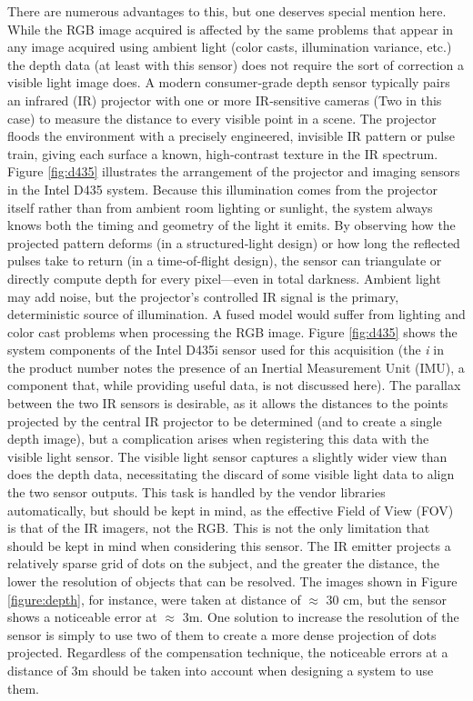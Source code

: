 \documentclass[letterpaper, notitlepage]{report}
\begin{document}
There are numerous advantages to this, but one deserves special mention here. While the RGB image acquired is affected by the same problems that appear in any image acquired using ambient light (color casts, illumination variance, etc.) the depth data (at least with this sensor) does not require the sort of correction a visible light image does. A modern consumer‑grade depth sensor typically pairs an infrared (IR) projector with one or more IR‑sensitive cameras (Two in this case) to measure the distance to every visible point in a scene. The projector floods the environment with a precisely engineered, invisible IR pattern or pulse train, giving each surface a known, high‑contrast texture in the IR spectrum. Figure \ref{fig:d435} illustrates the arrangement of the projector and imaging sensors in the Intel D435 system. Because this illumination comes from the projector itself rather than from ambient room lighting or sunlight, the system always knows both the timing and geometry of the light it emits. By observing how the projected pattern deforms (in a structured‑light design) or how long the reflected pulses take to return (in a time‑of‑flight design), the sensor can triangulate or directly compute depth for every pixel---even in total darkness. Ambient light may add noise, but the projector’s controlled IR signal is the primary, deterministic source of illumination. A fused model would suffer from lighting and color cast problems when processing the RGB image. Figure \ref{fig:d435} shows the system components of the Intel D435i sensor used for this acquisition (the \textit{i} in the product number notes the presence of an Inertial Measurement Unit (IMU), a component that, while providing useful data, is not discussed here). The parallax between the two IR sensors is desirable, as it allows the distances to the points projected by the central IR projector to be determined (and to create a single depth image), but a complication arises when registering this data with the visible light sensor. The visible light sensor captures a slightly wider view than does the depth data, necessitating the discard of some visible light data to align the two sensor outputs.  This task is handled by the vendor libraries automatically, but should be kept in mind, as the effective Field of View (FOV) is that of the IR imagers, not the RGB. This is not the only limitation that should be kept in mind when considering this sensor. The IR emitter projects a relatively sparse grid of dots on the subject, and the greater the distance, the lower the resolution of objects that can be resolved. The images shown in Figure \ref{figure:depth}, for instance, were taken at distance of $\approx$ 30 cm, but the sensor shows a noticeable error at $\approx$ 3m.  One solution to increase the resolution of the sensor is simply to use two of them to create a more dense projection of dots projected. Regardless of the compensation technique, the noticeable errors at a distance of 3m should be taken into account when designing a system to use them.
\end{document}
